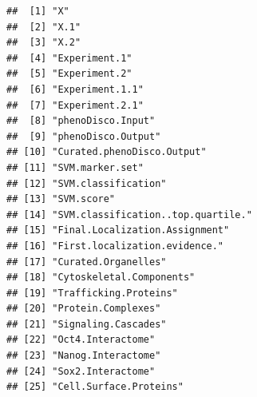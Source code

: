 \begin{Shaded}
\begin{Highlighting}[]
\end{Highlighting}
\end{Shaded}

\begin{verbatim}
##  [1] "X"                                
##  [2] "X.1"                              
##  [3] "X.2"                              
##  [4] "Experiment.1"                     
##  [5] "Experiment.2"                     
##  [6] "Experiment.1.1"                   
##  [7] "Experiment.2.1"                   
##  [8] "phenoDisco.Input"                 
##  [9] "phenoDisco.Output"                
## [10] "Curated.phenoDisco.Output"        
## [11] "SVM.marker.set"                   
## [12] "SVM.classification"               
## [13] "SVM.score"                        
## [14] "SVM.classification..top.quartile."
## [15] "Final.Localization.Assignment"    
## [16] "First.localization.evidence."     
## [17] "Curated.Organelles"               
## [18] "Cytoskeletal.Components"          
## [19] "Trafficking.Proteins"             
## [20] "Protein.Complexes"                
## [21] "Signaling.Cascades"               
## [22] "Oct4.Interactome"                 
## [23] "Nanog.Interactome"                
## [24] "Sox2.Interactome"                 
## [25] "Cell.Surface.Proteins"
\end{verbatim}

\begin{Shaded}
\begin{Highlighting}[]
\NormalTok{(hl)[}\NormalTok{:}\NormalTok{] <-}\StringTok{ }\NormalTok{(}\NormalTok{, }\NormalTok{, }\NormalTok{)}
\NormalTok{(hl)[}\NormalTok{:}\NormalTok{] <-}\StringTok{ }\NormalTok{(}\NormalTok{, }\NormalTok{:}\NormalTok{)}
\NormalTok{(hl)[}\NormalTok{:}\NormalTok{, }\NormalTok{:}\NormalTok{]}
\end{Highlighting}
\end{Shaded}

